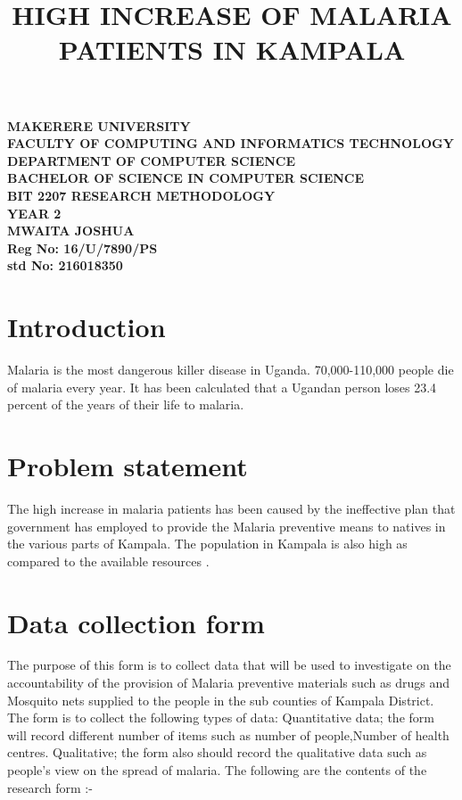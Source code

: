 \documentclass[a4paper,12pt]{article}
\begin{document}
\begin{Huge}
\begin{center}
\begin{normalsize}

\textbf{MAKERERE UNIVERSITY } \\
\textbf{FACULTY OF COMPUTING AND INFORMATICS TECHNOLOGY} \\
\textbf{DEPARTMENT OF COMPUTER SCIENCE} \\
\textbf{BACHELOR OF SCIENCE IN COMPUTER SCIENCE} \\
\textbf{BIT 2207 RESEARCH METHODOLOGY} \\
\textbf{YEAR 2} \\


\textbf{\sc MWAITA JOSHUA } \\
\textbf{\sc Reg No: 16/U/7890/PS } \\
\textbf{\sc std No: 216018350}\\
\end{normalsize}
\end{center}
\end{Huge}
\newpage

\title{HIGH INCREASE OF MALARIA PATIENTS IN KAMPALA}
\maketitle    
\section{Introduction}
Malaria is the most dangerous killer disease in Uganda. 70,000-110,000 people die of malaria every year. It has been calculated that a Ugandan person loses 23.4 percent of the years of their life to malaria.  
\section{Problem statement}                                                                                                                                                                                    
The high increase in malaria patients has been caused by the ineffective plan that government has employed to provide the Malaria preventive means to natives in the various parts of Kampala. The population in Kampala is also high as compared to the available resources .
\section{Data collection form}
The purpose of this form is to collect data that will be used to investigate on the accountability of the provision of Malaria preventive materials such as drugs and Mosquito nets supplied to the people in the sub counties of Kampala District.
The form is to collect the following types of data:
Quantitative data;
 the form will record different number of items such as number of people,Number of health centres.
 Qualitative;
 the form also should record the qualitative data such as people's view on the spread of malaria.
The following are the contents of the research form :-
 
\end{document}
